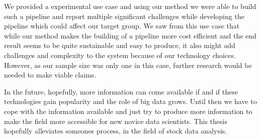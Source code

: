 We provided a experimental use case and using our method we were able to build such a pipeline and report multiple significant challenges while developing the pipeline which could affect our target group.
We saw from this use case that while our method makes the building of a pipeline more cost efficient and the end result seems to be quite sustainable and easy to produce, it also might add challenges and complexity to the system because of our technology choices.
However, as our sample size was only one in this case, further research would be needed to make viable claims.

In the future, hopefully, more information can come available if and if these technologies gain popularity and the role of big data grows.
Until then we have to cope with the information available and just try to produce more information to make the field more accessible for new novice data scientists.
This thesis hopefully alleviates someones process, in the field of stock data analysis.
